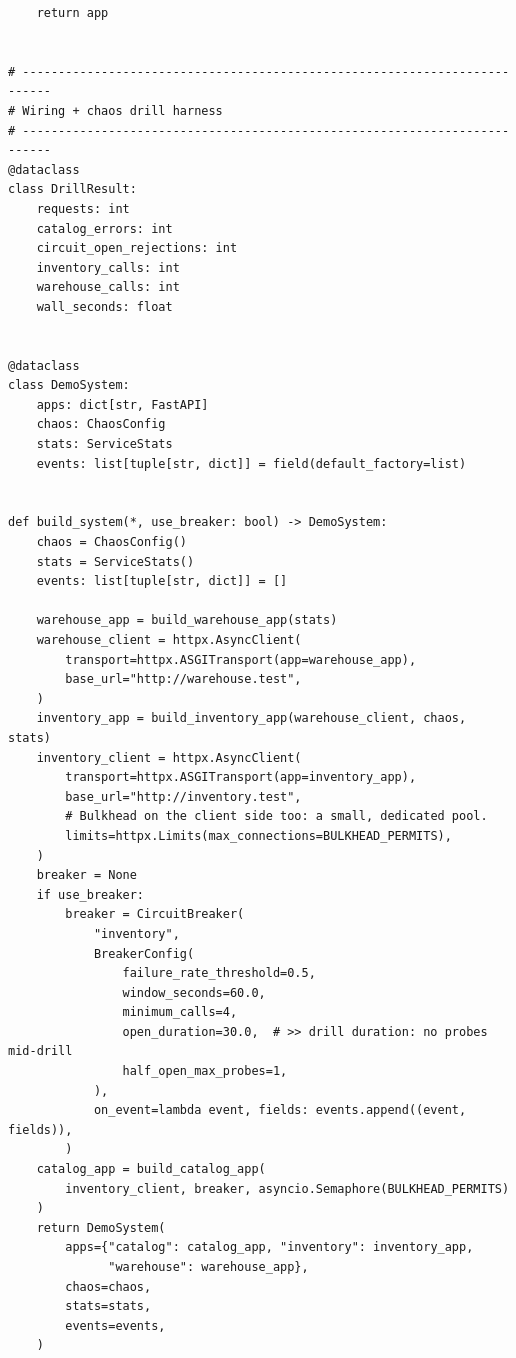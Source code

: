 \begin{verbatim}
    return app


# --------------------------------------------------------------------------
# Wiring + chaos drill harness
# --------------------------------------------------------------------------
@dataclass
class DrillResult:
    requests: int
    catalog_errors: int
    circuit_open_rejections: int
    inventory_calls: int
    warehouse_calls: int
    wall_seconds: float


@dataclass
class DemoSystem:
    apps: dict[str, FastAPI]
    chaos: ChaosConfig
    stats: ServiceStats
    events: list[tuple[str, dict]] = field(default_factory=list)


def build_system(*, use_breaker: bool) -> DemoSystem:
    chaos = ChaosConfig()
    stats = ServiceStats()
    events: list[tuple[str, dict]] = []

    warehouse_app = build_warehouse_app(stats)
    warehouse_client = httpx.AsyncClient(
        transport=httpx.ASGITransport(app=warehouse_app),
        base_url="http://warehouse.test",
    )
    inventory_app = build_inventory_app(warehouse_client, chaos, stats)
    inventory_client = httpx.AsyncClient(
        transport=httpx.ASGITransport(app=inventory_app),
        base_url="http://inventory.test",
        # Bulkhead on the client side too: a small, dedicated pool.
        limits=httpx.Limits(max_connections=BULKHEAD_PERMITS),
    )
    breaker = None
    if use_breaker:
        breaker = CircuitBreaker(
            "inventory",
            BreakerConfig(
                failure_rate_threshold=0.5,
                window_seconds=60.0,
                minimum_calls=4,
                open_duration=30.0,  # >> drill duration: no probes mid-drill
                half_open_max_probes=1,
            ),
            on_event=lambda event, fields: events.append((event, fields)),
        )
    catalog_app = build_catalog_app(
        inventory_client, breaker, asyncio.Semaphore(BULKHEAD_PERMITS)
    )
    return DemoSystem(
        apps={"catalog": catalog_app, "inventory": inventory_app,
              "warehouse": warehouse_app},
        chaos=chaos,
        stats=stats,
        events=events,
    )



\end{verbatim}
